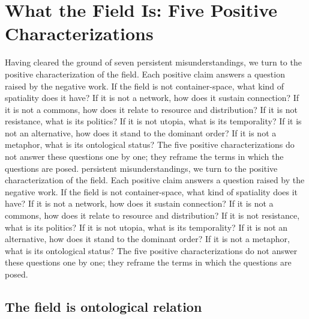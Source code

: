 \section{What the Field Is: Five Positive Characterizations}

Having cleared the ground of seven persistent misunderstandings, we turn to the positive characterization of the field. Each positive claim answers a question raised by the negative work. If the field is not container-space, what kind of spatiality does it have? If it is not a network, how does it sustain connection? If it is not a commons, how does it relate to resource and distribution? If it is not resistance, what is its politics? If it is not utopia, what is its temporality? If it is not an alternative, how does it stand to the dominant order? If it is not a metaphor, what is its ontological status? The five positive characterizations do not answer these questions one by one; they reframe the terms in which the questions are posed. persistent misunderstandings, we turn to the positive characterization of the field. Each positive claim answers a question raised by the negative work. If the field is not container-space, what kind of spatiality does it have? If it is not a network, how does it sustain connection? If it is not a commons, how does it relate to resource and distribution? If it is not resistance, what is its politics? If it is not utopia, what is its temporality? If it is not an alternative, how does it stand to the dominant order? If it is not a metaphor, what is its ontological status? The five positive characterizations do not answer these questions one by one; they reframe the terms in which the questions are posed.

\subsection{The field is ontological relation}

